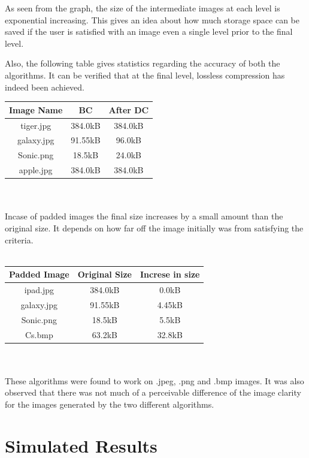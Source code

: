 \documentclass[twocolumn,12pt]{article}
\begin{document}
As seen from the graph, the size of the intermediate images at each level is exponential increasing. This gives an idea about how much storage space can be saved if the user is satisfied with an image even a single level prior to the final level.

Also, the following table gives statistics regarding the accuracy of both the algorithms. It can be verified that at the final level, lossless compression has indeed been achieved.\\


\begin{tabular}{|c|c|c|}
\hline
Image Name&BC&After DC\\
\hline
tiger.jpg&384.0kB&384.0kB\\
\hline
galaxy.jpg&91.55kB&96.0kB\\
\hline
Sonic.png&18.5kB&24.0kB\\
\hline
apple.jpg&384.0kB&384.0kB\\
\hline
\end{tabular}\\\\

Incase of padded images the final size increases by a small amount than the original size. It depends on how far off the image initially was from satisfying the criteria. \\\\
\begin{tabular}{|c|c|c|}
\hline
Padded Image&Original Size&Increse in size\\
\hline
ipad.jpg&384.0kB&0.0kB\\
\hline
galaxy.jpg&91.55kB&4.45kB\\
\hline
Sonic.png&18.5kB&5.5kB\\
\hline
Cs.bmp&63.2kB&32.8kB\\
\hline
\end{tabular}\\\\

These algorithms were found to work on .jpeg, .png and .bmp images. It was also observed that there was not much of a perceivable difference of the image clarity for the images generated by the two different algorithms.
\section{Simulated Results}
\end{document}
